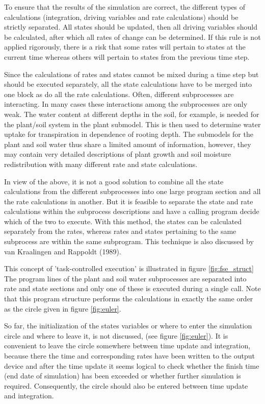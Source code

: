 To ensure that the results of the simulation are correct, the different types of calculations
(integration, driving variables and rate calcula\-tions) should be strictly separated. All states
should be updated, then all driving variables should be calculat\-ed, after which all rates of
change can be determined. If this rule is not applied rigorous\-ly, there is a risk that some
rates will pertain to states at the current time whereas others will pertain to states from
the previous time step.

Since the calculations of rates and states cannot be mixed during a time step but should be
executed separately, all the state calculations have to be merged into one block as do all
the rate calculations. Often, different subprocesses are interacting. In many cases these
interactions among the subprocesses are only weak. The water content at different depths
in the soil, for example, is needed for the plant/soil system in the plant submodel. This is
then used to deter\-mine water uptake for transpiration in dependence of rooting depth. The
submodels for the plant and soil water thus share a limited amount of information,
however, they may contain very detailed descriptions of plant growth and soil moisture
redistribution with many different rate and state calcula\-tions.

In view of the above, it is not a good solution to combine all the state calculations from
the different subprocesses into one large program section and all the rate calculations in
another. But it is feasible to separate the state and rate calculations within the subprocess
descriptions and have a calling program decide which of the two to execute. With this
method, the states can be calculated separately from the rates, whereas rates and states
pertaining to the same subprocess are within the same subprogram. This technique is also
discussed by van Kraalingen and Rappoldt (1989).

This concept of 'task-controlled execution' is illustrated in figure \ref{fig:fse_struct} The program lines
of the plant and soil water subprocesses are separated into rate and state sections and only
one of these is executed during a single call. Note that this program structure performs
the calculations in exactly the same order as the circle given in figure \ref{fig:euler}.

So far, the initialization of the states variables or where to enter the simula\-tion circle and
where to leave it, is not discussed, (see figure \ref{fig:euler}). It is convenient to leave the circle
somewhere between time update and integration, because there the time and correspond\-ing 
rates have been written to the output device and after the time update it seems logical
to check whether the finish time (end date of simulation) has been exceeded or whether
further simulation is required. Consequently, the circle should also be entered between
time update and integration.


